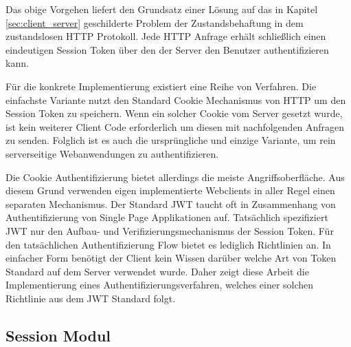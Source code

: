 Das obige Vorgehen liefert den Grundsatz einer Lösung auf das in Kapitel \ref{sec:client_server} geschilderte Problem der Zustandsbehaftung in dem zustandslosen HTTP Protokoll.
Jede HTTP Anfrage erhält schließlich einen eindeutigen Session Token über den der Server den Benutzer authentifizieren kann. 

Für die konkrete Implementierung existiert eine Reihe von Verfahren. Die einfachste Variante nutzt den Standard Cookie Mechanismus von HTTP um den Session Token zu speichern. Wenn ein solcher Cookie vom Server gesetzt wurde, ist kein weiterer Client Code erforderlich um diesen mit nachfolgenden Anfragen zu senden. Folglich ist es auch die ursprüngliche und einzige Variante, um rein serverseitige Webanwendungen zu authentifizieren.

Die Cookie Authentifizierung bietet allerdings die meiste Angriffsoberfläche. Aus diesem Grund verwenden eigen implementierte Webclients in aller Regel einen separaten Mechanismus. Der Standard JWT taucht oft in Zusammenhang von Authentifizierung von Single Page Applikationen auf.
Tatsächlich spezifiziert JWT nur den Aufbau- und Verifizierungsmechanismus der Session Token. 
Für den tatsächlichen Authentifizierung Flow bietet es lediglich Richtlinien an. In einfacher Form benötigt der Client kein Wissen darüber welche Art von Token Standard auf dem Server verwendet wurde. Daher zeigt diese Arbeit die Implementierung eines Authentifizierungsverfahren, welches einer solchen Richtlinie aus dem JWT Standard folgt. 

\subsection{Session Modul}



